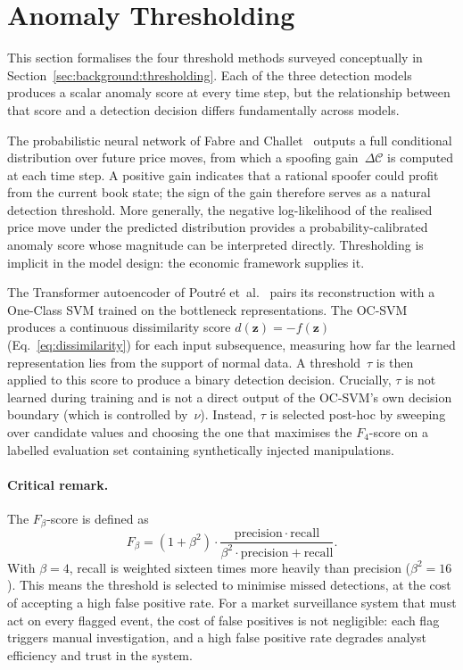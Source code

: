 \documentclass[11pt]{report}
\begin{document}
\section{Anomaly Thresholding}\label{sec:methodology:thresholds}

This section formalises the four threshold methods surveyed conceptually in Section~\ref{sec:background:thresholding}. Each of the three detection models produces a scalar anomaly score at every time step, but the relationship between that score and a detection decision differs fundamentally across models.

The probabilistic neural network of Fabre and Challet~\cite{fabre_2025} outputs a full conditional distribution over future price moves, from which a spoofing gain~$\Delta\mathcal{C}$ is computed at each time step. A positive gain indicates that a rational spoofer could profit from the current book state; the sign of the gain therefore serves as a natural detection threshold. More generally, the negative log-likelihood of the realised price move under the predicted distribution provides a probability-calibrated anomaly score whose magnitude can be interpreted directly. Thresholding is implicit in the model design: the economic framework supplies it.

The Transformer autoencoder of Poutr\'e et~al.~\cite{poutre_2024} pairs its reconstruction with a One-Class SVM trained on the bottleneck representations. The OC-SVM produces a continuous dissimilarity score $d(\mathbf{z}) = -f(\mathbf{z})$ (Eq.~\ref{eq:dissimilarity}) for each input subsequence, measuring how far the learned representation lies from the support of normal data. A threshold~$\tau$ is then applied to this score to produce a binary detection decision. Crucially, $\tau$ is not learned during training and is not a direct output of the OC-SVM's own decision boundary (which is controlled by~$\nu$). Instead, $\tau$ is selected post-hoc by sweeping over candidate values and choosing the one that maximises the $F_4$-score on a labelled evaluation set containing synthetically injected manipulations.

\paragraph{Critical remark.}
The $F_\beta$-score is defined as
\begin{equation*}
  F_\beta = (1 + \beta^2) \cdot \frac{\mathrm{precision} \cdot \mathrm{recall}}{\beta^2 \cdot \mathrm{precision} + \mathrm{recall}}.
\end{equation*}
With $\beta = 4$, recall is weighted sixteen times more heavily than precision ($\beta^2 = 16$). This means the threshold is selected to minimise missed detections, at the cost of accepting a high false positive rate. For a market surveillance system that must act on every flagged event, the cost of false positives is not negligible: each flag triggers manual investigation, and a high false positive rate degrades analyst efficiency and trust in the system.
\end{document}
